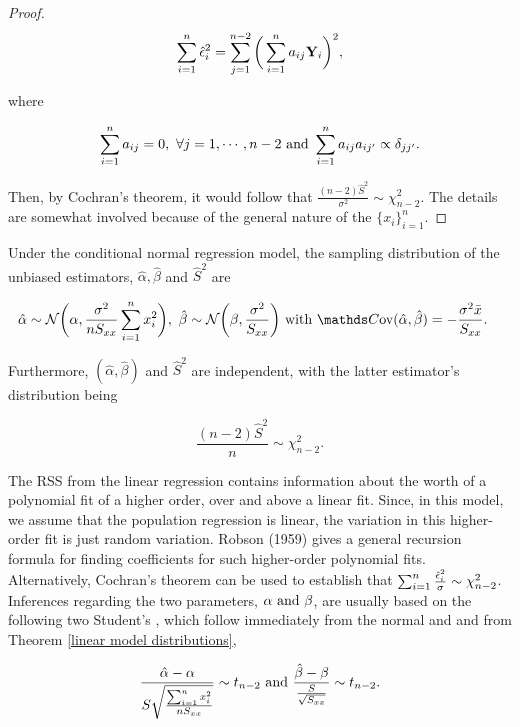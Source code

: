 \documentclass{homework}
\begin{document}
\begin{theo}
{\begin{proof}
$$
\sum_{i=1}^{n} \hat{\epsilon}_i^2 = \sum_{j=1}^{n-2}\bigg(\sum_{i=1}^{n} a_{ij} {\bf Y}_i \bigg)^2,
$$

where 

$$
\sum_{i=1}^{n} a_{ij} = 0, \textnormal{ } \forall j = 1, \cdots, n-2 \textnormal{ and } \sum_{i=1}^{n} a_{ij} a_{ij'} \propto \delta_{jj'}.
$$

Then, by Cochran's theorem, it would follow that $\frac{(n-2)\hat{S}^2}{\sigma^2} \sim \chi^2_{n-2}$. The details are somewhat involved because of the general nature of the $\{x_i\}_{i=1}^{n}$. 

\end{proof}}
Under the conditional normal regression model, the sampling distribution of the unbiased estimators, $\hat{\alpha}, \hat{\beta}$ and $\hat{S}^2$ are 

\begin{align*}
    \hat{\alpha} \sim \N\bigg(\alpha, \frac{\sigma^2}{nS_{xx}} \summation x_i^2\bigg), \blank  & \hat{\beta} \sim \N\bigg(\beta, \frac{\sigma^2}{S_{xx}}\bigg) \textnormal{ with } \cov(\hat{\alpha}, \hat{\beta}) = -\frac{\sigma^2 \bar{x}}{S_{xx}}.
\end{align*}

Furthermore, $(\hat{\alpha}, \hat{\beta})$ and $\hat{S}^2$ are independent, with the latter estimator's distribution being 

$$
\frac{(n-2)\hat{S}^2}{n} \sim \chi_{n-2}^2. 
$$
\end{theo}

\blank \textnormal{}

The RSS from the linear regression contains information about the worth of a polynomial fit of a higher order, over and above a linear fit. Since, in this model, we assume that the population regression is linear, the variation in this higher-order fit is just random variation. Robson (1959) gives a general recursion formula for finding coefficients for such higher-order polynomial fits. Alternatively, Cochran's theorem can be used to establish that $\sum_{i=1}^{n} \frac{\hat{\epsilon}_i^2}{\sigma} \sim \chi^2_{n-2} $. \\

Inferences regarding the two parameters, $\alpha \textnormal{ and } \beta$, are usually based on the following two Student's \tdis, which follow immediately from the normal and \chidis and from Theorem \ref{linear model distributions}, 

\begin{align*}
    \frac{\hat{\alpha}-\alpha}{S \sqrt{\frac{\sum_{i=1}^{n} x_i^2}{nS_{xx}}}} \sim t_{n-2} \textnormal{ and } \frac{\hat{\beta}-\beta}{\frac{S}{\sqrt{S_{xx}}}} \sim t_{n-2}.
\end{align*}
\end{document}
